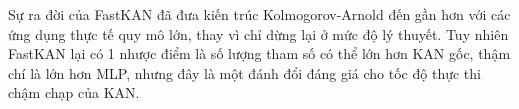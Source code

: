 Sự ra đời của FastKAN đã đưa kiến trúc Kolmogorov-Arnold đến gần hơn với các ứng dụng thực tế quy mô lớn, thay vì chỉ dừng lại ở mức độ lý thuyết. Tuy nhiên FastKAN lại có 1 nhược điểm là số lượng tham số có thể lớn hơn KAN gốc, thậm chí là lớn hơn MLP, nhưng đây là một đánh đổi đáng giá cho tốc độ thực thi chậm chạp của KAN.